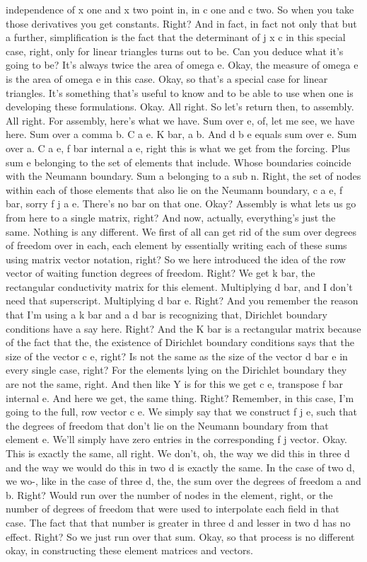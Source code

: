 \documentclass[10pt]{article}
\begin{document}
independence of x one and x two point in, in c one and c two. So when you take those derivatives you get constants. Right? And in fact, in fact not only that but a further, simplification is the fact that the determinant of j x c in this special case, right, only for linear triangles turns out to be. Can you deduce what it's going to be? It's always twice the area of omega e. Okay, the measure of omega e is the area of omega e in this case. Okay, so that's a special case for linear triangles. It's something that's useful to know and to be able to use when one is developing these formulations. Okay. All right. So let's return then, to assembly. All right. For assembly, here's what we have. Sum over e, of, let me see, we have here. Sum over a comma b. C a e. K bar, a b. And d b e equals sum over e. Sum over a. C a e, f bar internal a e, right this is what we get from the forcing. Plus sum e belonging to the set of elements that include. Whose boundaries coincide with the Neumann boundary. Sum a belonging to a sub n. Right, the set of nodes within each of those elements that also lie on the Neumann boundary, c a e, f bar, sorry f j a e. There's no bar on that one. Okay? Assembly is what lets us go from here to a single matrix, right? And now, actually, everything's just the same. Nothing is any different. We first of all can get rid of the sum over degrees of freedom over in each, each element by essentially writing each of these sums using matrix vector notation, right? So we here introduced the idea of the row vector of waiting function degrees of freedom. Right? We get k bar, the rectangular conductivity matrix for this element. Multiplying d bar, and I don't need that superscript. Multiplying d bar e. Right? And you remember the reason that I'm using a k bar and a d bar is recognizing that, Dirichlet boundary conditions have a say here. Right? And the K bar is a rectangular matrix because of the fact that the, the existence of Dirichlet boundary conditions says that the size of the vector c e, right? Is not the same as the size of the vector d bar e in every single case, right? For the elements lying on the Dirichlet boundary they are not the same, right. And then like Y is for this we get c e, transpose f bar internal e. And here we get, the same thing. Right? Remember, in this case, I'm going to the full, row vector c e. We simply say that we construct f j e, such that the degrees of freedom that don't lie on the Neumann boundary from that element e. We'll simply have zero entries in the corresponding f j vector. Okay. This is exactly the same, all right. We don't, oh, the way we did this in three d and the way we would do this in two d is exactly the same. In the case of two d, we wo-, like in the case of three d, the, the sum over the degrees of freedom a and b. Right? Would run over the number of nodes in the element, right, or the number of degrees of freedom that were used to interpolate each field in that case. The fact that that number is greater in three d and lesser in two d has no effect. Right? So we just run over that sum. Okay, so that process is no different okay, in constructing these element matrices and vectors.
\end{document}
